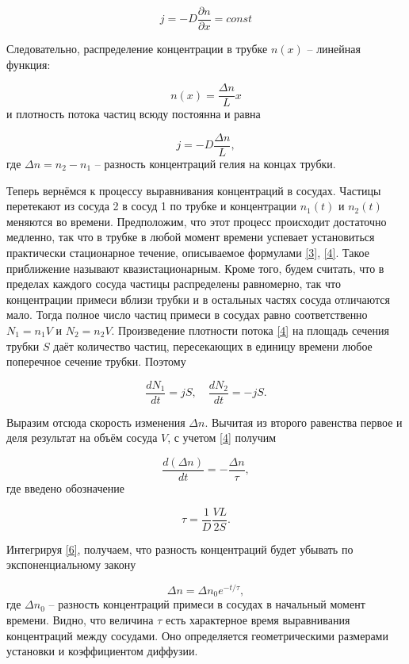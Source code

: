 \documentclass[a4paper, 12pt]{article}
\begin{document}
\[ j=-D\frac{\partial n}{\partial x} = const \]

Следовательно, распределение концентрации в трубке $ n(x) $ -- линейная
функция:

\begin{equation}\label{3}
n(x) = \frac{\Delta n}{L} x
\end{equation}
и плотность потока частиц всюду постоянна и равна

\begin{equation}\label{4}
j=-D\frac{\Delta n}{L},
\end{equation}
где $ \Delta n = n_2-n_1 $ -- разность концентраций гелия на концах трубки.

Теперь вернёмся к процессу выравнивания концентраций в сосудах. Частицы перетекают из сосуда 2 в сосуд 1 по трубке и концентрации $ n_1(t) $ и $ n_2(t) $ меняются во времени. Предположим, что этот процесс происходит достаточно медленно, так что в трубке в любой момент времени успевает установиться практически стационарное течение, описываемое формулами \eqref{3}, \eqref{4}. Такое приближение называют квазистационарным. Кроме того, будем считать, что в пределах каждого сосуда частицы распределены равномерно, так что концентрации примеси вблизи трубки и в остальных частях сосуда отличаются мало. Тогда полное число частиц примеси в сосудах равно соответственно $ N_1=n_1V $ и $ N_2=n_2V $. Произведение плотности потока \eqref{4} на площадь сечения трубки $ S $ даёт количество частиц, пересекающих в единицу времени любое поперечное сечение трубки. Поэтому

\begin{equation}\label{5}
    \frac{dN_1}{dt}=jS, \quad \frac{dN_2}{dt}=-jS.
\end{equation}

Выразим отсюда скорость изменения $ \Delta n $. Вычитая из второго равенства первое и деля результат на объём сосуда $ V $, с учетом \eqref{4} получим

\begin{equation}\label{6}
    \frac{d(\Delta n)}{dt}=-\frac{\Delta n}{\tau},
\end{equation}
где введено обозначение

\begin{equation}\label{7}
    \tau=\frac{1}{D}\frac{VL}{2S}.
\end{equation}

Интегрируя \eqref{6}, получаем, что разность концентраций будет убывать по экспоненциальному закону

\begin{equation}\label{8}
    \Delta n = \Delta n_0 e^{-t/\tau},
\end{equation}
где $ \Delta n_0 $ -- разность концентраций примеси в сосудах в начальный момент времени. Видно, что величина $ \tau $ есть характерное время выравнивания концентраций между сосудами. Оно определяется геометрическими размерами установки и коэффициентом диффузии.\\
\end{document}
